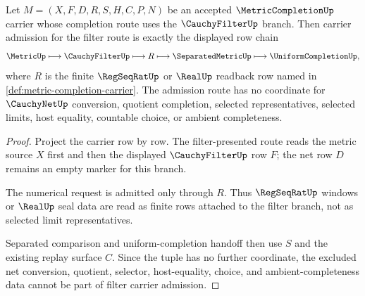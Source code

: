\begin{theorem}
\label{thm:metriccompletion-cauchyfilter-carrier-admission}
Let $M=(X,F,D,R,S,H,C,P,N)$ be an accepted $\MetricCompletionUp$ carrier whose completion route uses the $\CauchyFilterUp$ branch. Then carrier admission for the filter route is exactly the displayed row chain
$$
\MetricUp\longmapsto\CauchyFilterUp\longmapsto R\longmapsto\SeparatedMetricUp\longmapsto\UniformCompletionUp ,
$$
where $R$ is the finite $\RegSeqRatUp$ or $\RealUp$ readback row named in \autoref{def:metric-completion-carrier}. The admission route has no coordinate for $\CauchyNetUp$ conversion, quotient completion, selected representatives, selected limits, host equality, countable choice, or ambient completeness.
\end{theorem}
\begin{proof}
Project the carrier row by row. The filter-presented route reads the metric source $X$ first and then the displayed $\CauchyFilterUp$ row $F$; the net row $D$ remains an empty marker for this branch.

The numerical request is admitted only through $R$. Thus $\RegSeqRatUp$ windows or $\RealUp$ seal data are read as finite rows attached to the filter branch, not as selected limit representatives.

Separated comparison and uniform-completion handoff then use $S$ and the existing replay surface $C$. Since the tuple has no further coordinate, the excluded net conversion, quotient, selector, host-equality, choice, and ambient-completeness data cannot be part of filter carrier admission.
\end{proof}

